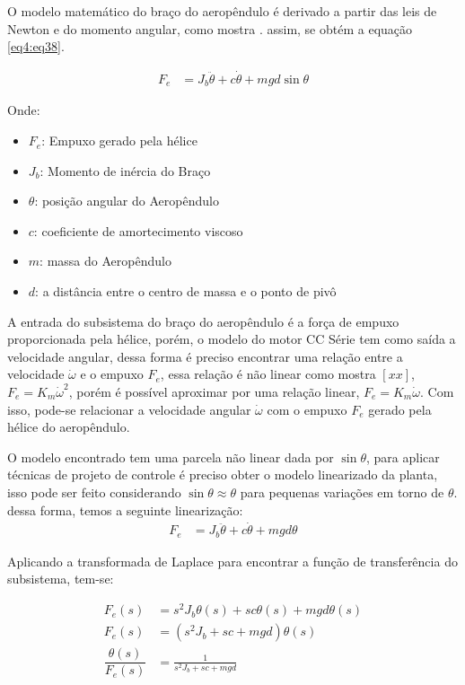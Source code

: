 O modelo matemático do braço do aeropêndulo é derivado a partir das leis de Newton e do momento angular, como mostra \cite{amin}. assim, se obtém a equação \ref{eq4:eq38}.

\begin{align}
    F_e &= J_b\ddot{\theta} + c\dot{\theta} +mgd\sin{\theta}  \label{eq4:eq38}
\end{align}

Onde:

\begin{itemize}
        \setlength{\itemsep}{-2pt}
	\item  $F_e$: Empuxo gerado pela hélice
        \item  $J_b$: Momento de inércia do Braço
        \item  $\theta$: posição angular do Aeropêndulo
        \item  $c$: coeficiente de amortecimento viscoso
        \item  $m$: massa do Aeropêndulo
        \item  $d$: a distância entre o centro de massa e o ponto de pivô
\end{itemize}

A entrada do subsistema do braço do aeropêndulo é a força de empuxo proporcionada pela hélice, porém, o modelo do motor CC Série tem como saída a velocidade angular, dessa forma é preciso encontrar uma relação entre a velocidade $\dot{\omega}$ e o empuxo $F_e$, essa relação é não linear como mostra $[xx]$, $F_e = K_m\dot{\omega}^2$, porém é possível aproximar por uma relação linear,  $F_e = K_m\dot{\omega}$. Com isso, pode-se relacionar a velocidade angular $\dot{\omega}$  com o empuxo $F_e$ gerado pela hélice do aeropêndulo.

O modelo encontrado tem uma parcela não linear dada por $\sin{\theta}$, para aplicar técnicas de projeto de controle é preciso obter o modelo linearizado da planta, isso pode ser feito considerando $\sin{\theta} \approx \theta$ para pequenas variações em torno de $\theta$. dessa forma, temos a seguinte linearização:
\begin{align}
    F_e &= J_b\ddot{\theta} + c\dot{\theta} +mgd\theta
    \label{eq4:eq39}
\end{align}

Aplicando a transformada de Laplace para encontrar a função de transferência do subsistema, tem-se:

\begin{align}
    F_e(s) &= s^2J_b\theta(s) + sc\theta(s) +mgd\theta(s) \label{eq4:eq41}\\
    F_e(s) &= (s^2J_b + sc +mgd)\theta(s) \label{eq4:eq42}\\
    \dfrac{\theta(s)}{F_e(s)} &= \frac{1}{s^2J_b + sc +mgd} \label{eq4:eq43}
\end{align}


